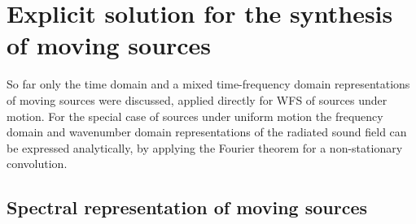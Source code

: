 \section{Explicit solution for the synthesis of moving sources}

So far only the time domain and a mixed time-frequency domain representations of moving sources were discussed, applied directly for WFS of sources under motion.
For the special case of sources under uniform motion the frequency domain and wavenumber domain representations of the radiated sound field can be expressed analytically, by applying the Fourier theorem for a non-stationary convolution.

\subsection{Spectral representation  of moving sources}

